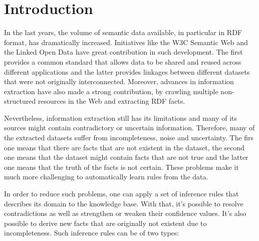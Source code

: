 \chapter{Introduction}
\label{ch:intro}

In the last years, the volume of semantic data available, in particular in RDF format, has dramatically increased.
Initiatives like the W3C Semantic Web and the Linked Open Data  have great contribution in such development. The first
provides a common standard that allows data to be shared and reused across different applications and the latter
provides linkages between different datasets that were not originally interconnected. Moreover, advances in information
extraction have also made a strong contribution, by crawling multiple non-structured resources in the Web and extracting
RDF facts.

Nevertheless, information extraction still has its limitations and many of its sources might contain contradictory
or uncertain information. Therefore, many of the extracted datasets suffer from incompleteness, noise and uncertainty.
The firs one means that there are facts that are not existent in the dataset, the second one means that the dataset
might contain facts that are not true and the latter one means that the truth of the facts is not certain. These
problems make it much more challenging to automatically learn rules from the data.


In order to reduce such problems, one can apply a set of inference rules that describes its domain to the knowledge
base. With that, it's possible to resolve contradictions as well as strengthen or weaken their confidence values. It's
also possible to derive new facts that are originally not existent due to incompleteness. Such inference rules can be of
two types:

